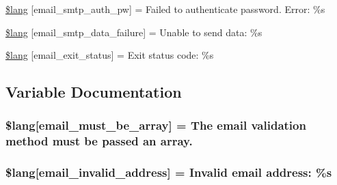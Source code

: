 \begin{DoxyCompactItemize}
\item 
\hyperlink{email__lang_8php_a09fd123f0d251a8eac845f985c6583c3}{\$lang} \mbox{[}\textquotesingle{}email\+\_\+smtp\+\_\+auth\+\_\+pw\textquotesingle{}\mbox{]} = \textquotesingle{}Failed to authenticate password. Error\+: \%s\textquotesingle{}
\item 
\hyperlink{email__lang_8php_a59801e23c2d745400384098c7bf0a6dc}{\$lang} \mbox{[}\textquotesingle{}email\+\_\+smtp\+\_\+data\+\_\+failure\textquotesingle{}\mbox{]} = \textquotesingle{}Unable to send data\+: \%s\textquotesingle{}
\item 
\hyperlink{email__lang_8php_a32b0c2f50acd03defc88df937ee2877f}{\$lang} \mbox{[}\textquotesingle{}email\+\_\+exit\+\_\+status\textquotesingle{}\mbox{]} = \textquotesingle{}Exit status code\+: \%s\textquotesingle{}
\end{DoxyCompactItemize}


\subsection{Variable Documentation}
\hypertarget{email__lang_8php_ac8c4b077e854bbdbb9a37b2d7f7c47fc}{}
\subsubsection[{\$lang}]{\setlength{\rightskip}{0pt plus 5cm}\$lang\mbox{[}\textquotesingle{}email\+\_\+must\+\_\+be\+\_\+array\textquotesingle{}\mbox{]} = \textquotesingle{}The email validation method must be passed an array.\textquotesingle{}}\label{email__lang_8php_ac8c4b077e854bbdbb9a37b2d7f7c47fc}
\hypertarget{email__lang_8php_a37759f6c728f3aaf8df6ca5bb8a3e832}{}
\subsubsection[{\$lang}]{\setlength{\rightskip}{0pt plus 5cm}\$lang\mbox{[}\textquotesingle{}email\+\_\+invalid\+\_\+address\textquotesingle{}\mbox{]} = \textquotesingle{}Invalid email address\+: \%s\textquotesingle{}}\label{email__lang_8php_a37759f6c728f3aaf8df6ca5bb8a3e832}
\hypertarget{email__lang_8php_a09c0c415b48ef267bf9e36b555be67d9}{}
